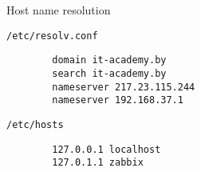 \begin{frame}[fragile]{Host name resolution}
\begin{block}{ {\tt /etc/resolv.conf}}
        \begin{lstlisting}
        domain it-academy.by
        search it-academy.by
        nameserver 217.23.115.244
        nameserver 192.168.37.1
        \end{lstlisting}
    \end{block}
\begin{block}{ {\tt /etc/hosts} }
        \begin{lstlisting}
        127.0.0.1 localhost
        127.0.1.1 zabbix
        \end{lstlisting}
\end{block}
\end{frame}
